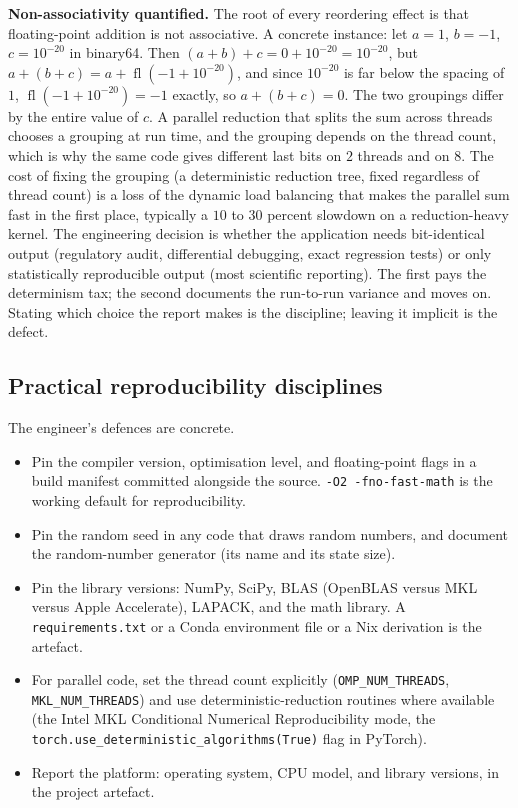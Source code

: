 \begin{mastery}
\textbf{Non-associativity quantified.} The root of every reordering
effect is that floating-point addition is not associative. A
concrete instance: let $a = 1$, $b = -1$, $c = 10^{-20}$ in
binary64. Then $(a + b) + c = 0 + 10^{-20} = 10^{-20}$, but
$a + (b + c) = a + \operatorname{fl}(-1 + 10^{-20})$, and since
$10^{-20}$ is far below the spacing of $1$, $\operatorname{fl}(-1 +
10^{-20}) = -1$ exactly, so $a + (b + c) = 0$. The two groupings
differ by the entire value of $c$. A parallel reduction that splits
the sum across threads chooses a grouping at run time, and the
grouping depends on the thread count, which is why the same code
gives different last bits on $2$ threads and on $8$. The cost of
fixing the grouping (a deterministic reduction tree, fixed
regardless of thread count) is a loss of the dynamic load balancing
that makes the parallel sum fast in the first place, typically a
$10$ to $30$ percent slowdown on a reduction-heavy kernel. The
engineering decision is whether the application needs bit-identical
output (regulatory audit, differential debugging, exact regression
tests) or only statistically reproducible output (most scientific
reporting). The first pays the determinism tax; the second documents
the run-to-run variance and moves on. Stating which choice the
report makes is the discipline; leaving it implicit is the defect.
\end{mastery}

\subsection{Practical reproducibility disciplines}

The engineer's defences are concrete.

\begin{itemize}[leftmargin=*]
  \item Pin the compiler version, optimisation level, and
    floating-point flags in a build manifest committed alongside
    the source. \texttt{-O2 -fno-fast-math} is the working
    default for reproducibility.
  \item Pin the random seed in any code that draws random numbers,
    and document the random-number generator (its name and its
    state size).
  \item Pin the library versions: NumPy, SciPy, BLAS (OpenBLAS
    versus MKL versus Apple Accelerate), LAPACK, and the math
    library. A \texttt{requirements.txt} or a Conda environment
    file or a Nix derivation is the artefact.
  \item For parallel code, set the thread count explicitly
    (\texttt{OMP\_NUM\_THREADS}, \texttt{MKL\_NUM\_THREADS}) and
    use deterministic-reduction routines where available (the
    Intel MKL Conditional Numerical Reproducibility mode, the
    \texttt{torch.use\_deterministic\_algorithms(True)} flag in
    PyTorch).
  \item Report the platform: operating system, CPU model, and
    library versions, in the project artefact.
\end{itemize}

